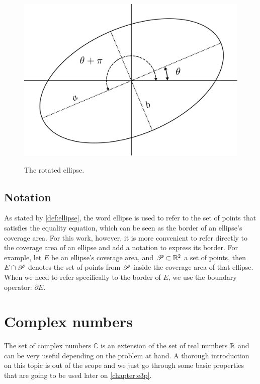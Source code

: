\begin{figure}[H]
	\centering
	
	\caption{The rotated ellipse.}
	\includegraphics[scale=.38]{tex/figures/rotated_ellipse}
	\fautor
	\label{fig:rotated_ellipse}
\end{figure}


\subsection{Notation}

As stated by \autoref{def:ellipse}, the word ellipse is used to refer to the set of points that satisfies the equality equation, which can be seen as the border of an ellipse's coverage area. For this work, however, it is more convenient to refer directly to the coverage area of an ellipse and add a notation to express its border. For example, let $E$ be an ellipse's coverage area, and $\mathscr{P} \subset \mathbb{R}^2$ a set of points, then $E \cap \mathscr{P}$ denotes the set of points from $\mathscr{P}$ inside the coverage area of that ellipse. When we need to refer specifically to the border of $E$, we use the boundary operator: $\partial E$.


\section{Complex numbers}

The set of complex numbers $\mathbb{C}$ is an extension of the set of real numbers $\mathbb{R}$ and can be very useful depending on the problem at hand. A thorough introduction on this topic is out of the scope and we just go through some basic properties that are going to be used later on \autoref{chapter:e3p}.

